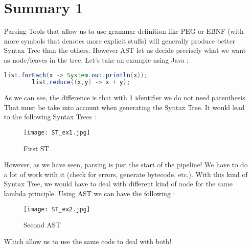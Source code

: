     \section{Summary 1}
    Parsing Tools that allow us to use grammar definition like PEG or EBNF (with
    more symbols that denotes more explicit stuffs) will generally produce
    better Syntax Tree than the others. However AST let us decide precisely what
    we want as node/leaves in the tree. Let's take an example using Java : 
    
    \begin{lstlisting}[language=Java]
        list.forEach(x -> System.out.println(x));
        list.reduce((x,y) -> x + y);
    \end{lstlisting}
    As we can see, the difference is that with 1 identifier we do not need
    parenthesis. That must be take into account when generating the Syntax Tree.
    It would lead to the following Syntax Trees : 
    \begin{figure}[H]
         \centering
         \texttt{[image: ST\_ex1.jpg]}
         \caption{First ST}
         \label{fig:first_st}
    \end{figure}

    However, as we have seen, parsing is just the start of the pipeline! We have
    to do a lot of work with it (check for errors, generate bytecode, etc.).
    With this kind of Syntax Tree, we would have to deal with different kind of
    node for the same lambda principle. Using AST we can have the following : 
    \begin{figure}[H]
         \centering
         \texttt{[image: ST\_ex2.jpg]}
         \caption{Second AST}
         \label{fig:second_ast}
    \end{figure}
    Which allow us to use the same code to deal with both!

